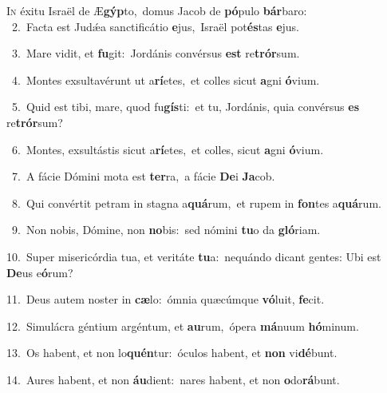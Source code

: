 \lettrine{\initial\textcolor{\initialcolor}{I}}{n} éxitu Israël de Æ\-\textbf{gýp}\-to,~\star domus Jacob de \textbf{pó}\-pulo \textbf{bár}\-baro:\\
{\numbfont\textcolor{\numbcolor}{~2.}}~Facta est Judǽa sanctificátio \textbf{e}\-jus,~\star Israël pot\-\textbf{és}\-tas \textbf{e}\-jus.\par
{\numbfont\textcolor{\numbcolor}{~3.}}~Mare vidit, et \textbf{fu}\-git:~\star Jordánis convérsus \textbf{est} re\-\textbf{trór}\-sum.\par
{\numbfont\textcolor{\numbcolor}{~4.}}~Montes exsultavérunt ut a\-\textbf{rí}\-etes,~\star et colles sicut \textbf{a}\-gni \textbf{ó}\-vium.\par
{\numbfont\textcolor{\numbcolor}{~5.}}~Quid est tibi, mare, quod fu\-\textbf{gís}\-ti:~\star et tu, Jordánis, quia convérsus \textbf{es} re\-\textbf{trór}\-sum?\par
{\numbfont\textcolor{\numbcolor}{~6.}}~Montes, exsultástis sicut a\-\textbf{rí}\-etes,~\star et colles, sicut \textbf{a}\-gni \textbf{ó}\-vium.\par
{\numbfont\textcolor{\numbcolor}{~7.}}~A fácie Dómini mota est \textbf{ter}\-ra,~\star a fácie \textbf{De}\-i \textbf{Ja}\-cob.\par
{\numbfont\textcolor{\numbcolor}{~8.}}~Qui convértit petram in stagna a\-\textbf{quá}\-rum,~\star et rupem in \textbf{fon}\-tes a\-\textbf{quá}\-rum.\par
{\numbfont\textcolor{\numbcolor}{~9.}}~Non nobis, Dómine, non \textbf{no}\-bis:~\star sed nómini \textbf{tu}\-o da \textbf{gló}\-riam.\par
{\numbfont\textcolor{\numbcolor}{10.}}~Super misericórdia tua, et veritáte \textbf{tu}\-a:~\star nequándo dicant gentes: Ubi est \textbf{De}\-us e\-\textbf{ó}\-rum?\par
{\numbfont\textcolor{\numbcolor}{11.}}~Deus autem noster in \textbf{cæ}\-lo:~\star ómnia quæcúmque \textbf{vó}\-luit, \textbf{fe}\-cit.\par
{\numbfont\textcolor{\numbcolor}{12.}}~Simulácra géntium argéntum, et \textbf{au}\-rum,~\star ópera \textbf{má}\-nuum \textbf{hó}\-minum.\par
{\numbfont\textcolor{\numbcolor}{13.}}~Os habent, et non lo\-\textbf{quén}\-tur:~\star óculos habent, et \textbf{non} vi\-\textbf{dé}\-bunt.\par
{\numbfont\textcolor{\numbcolor}{14.}}~Aures habent, et non \textbf{áu}\-dient:~\star nares habent, et non \textbf{o}\-do\-\textbf{rá}\-bunt.\par
